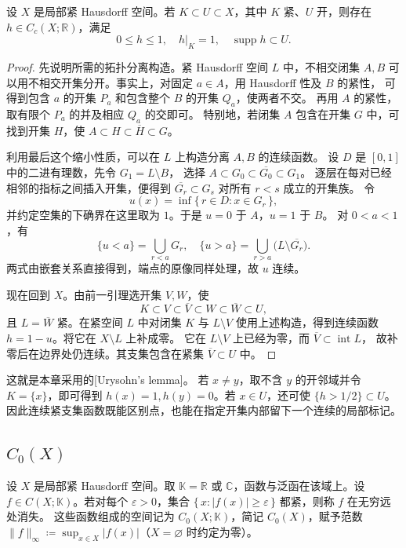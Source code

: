 \begin{lemma}\label{b1:lem:lch-cutoff}
设 \(X\) 是局部紧 Hausdorff 空间。若 \(K\subset U\subset X\)，其中 \(K\) 紧、\(U\) 开，则存在 \(h\in C_c(X;\mathbb R)\)，满足
\[
 0\leq h\leq1,\quad h|_K=1,\quad \operatorname{supp}h\subset U.
\]
\end{lemma}
\begin{proof}
先说明所需的拓扑分离构造。紧 Hausdorff 空间 \(L\) 中，不相交闭集 \(A,B\)
可以用不相交开集分开。事实上，对固定 \(a\in A\)，用 Hausdorff 性及 \(B\) 的紧性，
可得到包含 \(a\) 的开集 \(P_a\) 和包含整个 \(B\) 的开集 \(Q_a\)，使两者不交。
再用 \(A\) 的紧性，取有限个 \(P_a\) 的并及相应 \(Q_a\) 的交即可。
特别地，若闭集 \(A\) 包含在开集 \(G\) 中，可找到开集 \(H\)，使
\(A\subset H\subset\overline H\subset G\)。

利用最后这个缩小性质，可以在 \(L\) 上构造分离 \(A,B\) 的连续函数。
设 \(D\) 是 \([0,1]\) 中的二进有理数，先令 \(G_1=L\setminus B\)，
选择 \(A\subset G_0\subset\overline{G_0}\subset G_1\)。
逐层在每对已经相邻的指标之间插入开集，便得到
\(\overline{G_r}\subset G_s\) 对所有 \(r<s\) 成立的开集族。
令
\[
 u(x)=\inf\{\,r\in D:x\in G_r\,\},
\]
并约定空集的下确界在这里取为 \(1\)。于是 \(u=0\) 于 \(A\)，\(u=1\) 于 \(B\)。
对 \(0<a<1\)，有
\[
 \{u<a\}=\bigcup_{r<a}G_r,
 \quad
 \{u>a\}=\bigcup_{r>a}\bigl(L\setminus\overline{G_r}\bigr).
\]
两式由嵌套关系直接得到，端点的原像同样处理，故 \(u\) 连续。

现在回到 \(X\)。由前一引理选开集 \(V,W\)，使
\[
 K\subset V\subset\overline V\subset W\subset\overline W\subset U,
\]
且 \(L=\overline W\) 紧。在紧空间 \(L\) 中对闭集 \(K\) 与 \(L\setminus V\)
使用上述构造，得到连续函数 \(h=1-u\)。将它在 \(X\setminus L\) 上补成零。
它在 \(L\setminus V\) 上已经为零，而 \(\overline V\subset\operatorname{int}L\)，
故补零后在边界处仍连续。其支集包含在紧集 \(\overline V\subset U\) 中。
\end{proof}

这就是本章采用的[Urysohn's lemma]。
若 \(x\ne y\)，取不含 \(y\) 的开邻域并令 \(K=\{x\}\)，即可得到
\(h(x)=1,h(y)=0\)。若 \(x\in U\)，还可使 \(\{h>1/2\}\subset U\)。
因此连续紧支集函数既能区别点，也能在指定开集内部留下一个连续的局部标记。

\subsection{\texorpdfstring{\(C_0(X)\)}{C0(X)}}
\label{b1:subsec:110102}

\begin{definition}\label{b1:def:c0-space}
设 \(X\) 是局部紧 Hausdorff 空间。取 \(\mathbb K=\mathbb R\) 或 \(\mathbb C\)，函数与泛函在该域上。设 \(f\in C(X;\mathbb K)\)。若对每个 \(\varepsilon>0\)，集合
\(\{\,x:|f(x)|\geq\varepsilon\,\}\) 都紧，则称 \(f\) 在无穷远处消失。
这些函数组成的空间记为 \(C_0(X;\mathbb K)\)，简记 \(C_0(X)\)，赋予范数
\(\|f\|_\infty\coloneqq\sup_{x\in X}|f(x)|\)（\(X=\varnothing\) 时约定为零）。
\end{definition}

